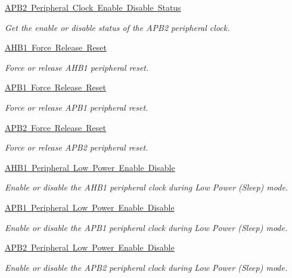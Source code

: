 \begin{DoxyCompactItemize}
\mbox{\hyperlink{group___r_c_c___a_p_b2___peripheral___clock___enable___disable___status}{A\+P\+B2 Peripheral Clock Enable Disable Status}}
\begin{DoxyCompactList}\small\item\em Get the enable or disable status of the A\+P\+B2 peripheral clock. \end{DoxyCompactList}\item 
\mbox{\hyperlink{group___r_c_c___a_h_b1___force___release___reset}{A\+H\+B1 Force Release Reset}}
\begin{DoxyCompactList}\small\item\em Force or release A\+H\+B1 peripheral reset. \end{DoxyCompactList}\item 
\mbox{\hyperlink{group___r_c_c___a_p_b1___force___release___reset}{A\+P\+B1 Force Release Reset}}
\begin{DoxyCompactList}\small\item\em Force or release A\+P\+B1 peripheral reset. \end{DoxyCompactList}\item 
\mbox{\hyperlink{group___r_c_c___a_p_b2___force___release___reset}{A\+P\+B2 Force Release Reset}}
\begin{DoxyCompactList}\small\item\em Force or release A\+P\+B2 peripheral reset. \end{DoxyCompactList}\item 
\mbox{\hyperlink{group___r_c_c___a_h_b1___low_power___enable___disable}{A\+H\+B1 Peripheral Low Power Enable Disable}}
\begin{DoxyCompactList}\small\item\em Enable or disable the A\+H\+B1 peripheral clock during Low Power (Sleep) mode. \end{DoxyCompactList}\item 
\mbox{\hyperlink{group___r_c_c___a_p_b1___low_power___enable___disable}{A\+P\+B1 Peripheral Low Power Enable Disable}}
\begin{DoxyCompactList}\small\item\em Enable or disable the A\+P\+B1 peripheral clock during Low Power (Sleep) mode. \end{DoxyCompactList}\item 
\mbox{\hyperlink{group___r_c_c___a_p_b2___low_power___enable___disable}{A\+P\+B2 Peripheral Low Power Enable Disable}}
\begin{DoxyCompactList}\small\item\em Enable or disable the A\+P\+B2 peripheral clock during Low Power (Sleep) mode. \end{DoxyCompactList}\item 

\end{DoxyCompactItemize}
